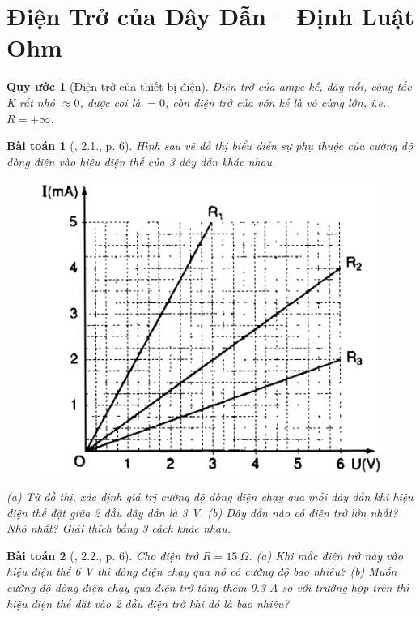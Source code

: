 \documentclass{article}
\newtheorem{baitoan}{Bài toán}
\newtheorem{quyuoc}{Quy ước}
\begin{document}

\section{Điện Trở của Dây Dẫn -- Định Luật Ohm}

\begin{quyuoc}[Điện trở của thiết bị điện]
	Điện trở của ampe kế, dây nối, công tắc K rất nhỏ $\approx0$, được coi là $= 0$, còn điện trở của vôn kế là vô cùng lớn, i.e., $R = +\infty$.
\end{quyuoc}

\begin{baitoan}[\cite{SBT_Vat_Ly_9}, 2.1., p. 6]
	Hình sau vẽ đồ thị biểu diễn sự phụ thuộc của cường độ dòng điện vào hiệu điện thế của 3 dây dẫn khác nhau.
	\begin{figure}[H]
		\centering
		\includegraphics[scale=0.3]{SBT_2.1}
	\end{figure}
	\noindent(a) Từ đồ thị, xác định giá trị cường độ dòng điện chạy qua mỗi dây dẫn khi hiệu điện thế đặt giữa 2 đầu dây dẫn là \emph{3 V}. (b) Dây dẫn nào có điện trở lớn nhất? Nhỏ nhất? Giải thích bằng 3 cách khác nhau.
\end{baitoan}

\begin{baitoan}[\cite{SBT_Vat_Ly_9}, 2.2., p. 6]
	Cho điện trở $R = 15\ \Omega$. (a) Khi mắc điện trở này vào hiệu điện thế \emph{6 V} thì dòng điện chạy qua nó có cường độ bao nhiêu? (b) Muốn cường độ dòng điện chạy qua điện trở tăng thêm \emph{0.3 A} so với trường hợp trên thì hiệu điện thế đặt vào 2 đầu điện trở khi đó là bao nhiêu?
\end{baitoan}
\end{document}
